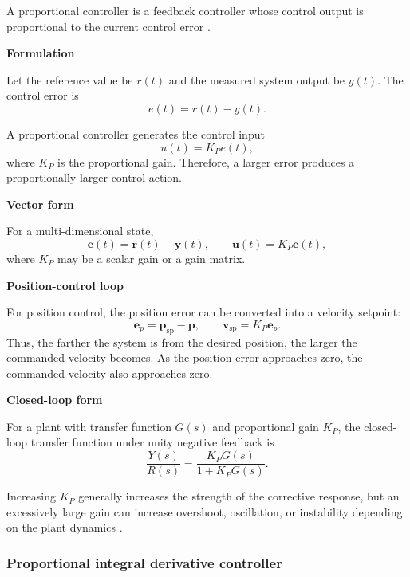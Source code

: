 \documentclass{book}
\providecommand{\ProjectDeepHeading}[2]{%
    \par\medskip\noindent\textbf{#2}\par\smallskip
}
\begin{document}
A proportional controller is a feedback controller whose control output is proportional to the current control error \cite{astrom-2008-feedback-systems-an-introduction-for-scientists-and-engineers}.

   \ProjectDeepHeading{1}{Formulation}
      Let the reference value be $r(t)$ and the measured system output be $y(t)$. The control error is
      \[
         e(t)=r(t)-y(t).
      \]

      A proportional controller generates the control input
      \[
         u(t)=K_P e(t),
      \]
      where $K_P$ is the proportional gain. Therefore, a larger error produces a proportionally larger control action.

   \ProjectDeepHeading{2}{Vector form}
      For a multi-dimensional state,
      \[
         \mathbf{e}(t)=\mathbf{r}(t)-\mathbf{y}(t),
         \qquad
         \mathbf{u}(t)=K_P\mathbf{e}(t),
      \]
      where $K_P$ may be a scalar gain or a gain matrix.

   \ProjectDeepHeading{2}{Position-control loop}
      For position control, the position error can be converted into a velocity setpoint:
      \[
         \mathbf{e}_p
         =
         \mathbf{p}_{\mathrm{sp}}
         -
         \mathbf{p},
         \qquad
         \mathbf{v}_{\mathrm{sp}}
         =
         K_P\mathbf{e}_p.
      \]
      Thus, the farther the system is from the desired position, the larger the commanded velocity becomes. As the position error approaches zero, the commanded velocity also approaches zero.

   \ProjectDeepHeading{2}{Closed-loop form}
      For a plant with transfer function $G(s)$ and proportional gain $K_P$, the closed-loop transfer function under unity negative feedback is
      \[
         \frac{Y(s)}{R(s)}
         =
         \frac{K_P G(s)}
              {1+K_P G(s)}.
      \]

      Increasing $K_P$ generally increases the strength of the corrective response, but an excessively large gain can increase overshoot, oscillation, or instability depending on the plant dynamics \cite{astrom-2008-feedback-systems-an-introduction-for-scientists-and-engineers}.

\subsubsection{Proportional integral derivative controller}

\end{document}

